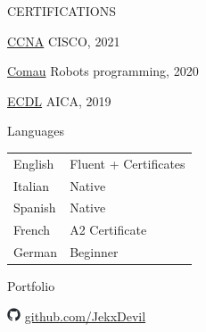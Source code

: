 \documentclass{cv} %
\def\iconsize{0.4cm}
\def\sidespacing{0.5cm}
\begin{document}
\begin{minipage}[b][0.9\paperheight][t]{0.29\linewidth}
    \vspace{\sidespacing}

    \begin{rSection}{CERTIFICATIONS}
        \item \underline{CCNA} {CISCO, 2021}
        \item \underline{Comau} {Robots programming, 2020}
        \item \underline{ECDL} {AICA, 2019}
    \end{rSection}

    \vspace{\sidespacing}

    \begin{rSection}{Languages}
        \vspace{0.2cm}
        \item \begin{tabular}{@{}ll@{}}
            English & Fluent + Certificates \\
            Italian & Native                \\
            Spanish & Native                \\
            French  & A2 Certificate        \\
            German  & Beginner              \\
        \end{tabular}
    \end{rSection}

    \vspace{\sidespacing}

    \begin{rSection}{Portfolio}
        \item[]\includegraphics[width=\iconsize, trim={0cm 0.4cm 0cm 0cm}]{github-mark.png}
        \href{https://github.com/JekxDevil}{github.com/JekxDevil}


\end{rSection}
\end{minipage}
\end{document}
